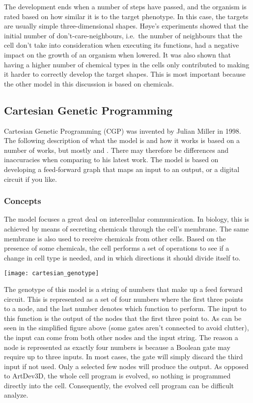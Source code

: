 The development ends when a number of steps have passed, and the organism is rated based on how similar it is to the target phenotype. In this case, the targets are usually simple three-dimensional shapes. H{\o}ye's experiments showed that the initial number of don't-care-neighbours, i.e.\ the number of neighbours that the cell don't take into consideration when executing its functions, had a negative impact on the growth of an organism when lowered. It was also shown that having a higher number of chemical types in the cells only contributed to making it harder to correctly develop the target shapes. This is most important because the other model in this discussion is based on chemicals.


\subsection{Cartesian Genetic Programming}
Cartesian Genetic Programming (CGP) was invented by Julian Miller in 1998. The following description of what the model is and how it works is based on a number of works, but mostly \cite{mteurogp2000} and \cite{ecal2003}. There may therefore be differences and inaccuracies when comparing to his latest work. The model is based on developing a feed-forward graph that maps an input to an output, or a digital circuit if you like.

\subsubsection{Concepts}
The model focuses a great deal on intercellular communication. In biology, this is achieved by means of secreting chemicals through the cell's membrane. The same membrane is also used to receive chemicals from other cells. Based on the presence of some chemicals, the cell performs a set of operations to see if a change in cell type is needed, and in which directions it should divide itself to.

\begin{center}\texttt{[image: cartesian\_genotype]}\end{center}

The genotype of this model is a string of numbers that make up a feed forward circuit. This is represented as a set of four numbers where the first three points to a node, and the last number denotes which function to perform. The input to this function is the output of the nodes that the first three point to. As can be seen in the simplified figure above (some gates aren't connected to avoid clutter), the input can come from both other nodes and the input string. The reason a node is represented as exactly four numbers is because a Boolean gate may require up to three inputs. In most cases, the gate will simply discard the third input if not used. Only a selected few nodes will produce the output. As opposed to ArtDev3D, the whole cell program is evolved, so nothing is programmed directly into the cell. Consequently, the evolved cell program can be difficult analyze.


